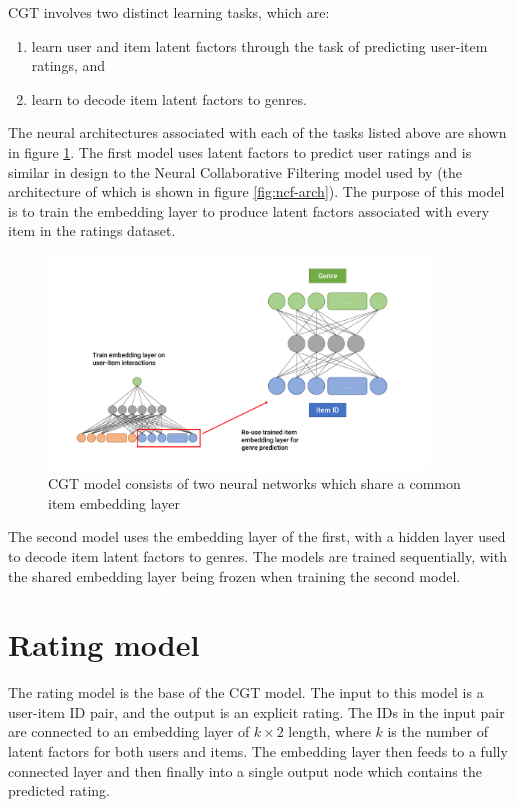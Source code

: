 CGT involves two distinct learning tasks, which are:
\begin{enumerate}
    \item learn user and item latent factors through the task of predicting user-item ratings, and
    \item learn to decode item latent factors to genres.
\end{enumerate}
The neural architectures associated with each of the tasks listed above are shown in figure \ref{fig:4_CGT-architecture}. The first model uses latent factors to predict user ratings and is similar in design to the Neural Collaborative Filtering model used by \citeauthor{he2017neural} (the architecture of which is shown in figure \ref{fig:ncf-arch}). The purpose of this model is to train the embedding layer to produce latent factors associated with every item in the ratings dataset.

\begin{figure}[H]
\centering
\includegraphics[width=0.9\textwidth]{Figures/4_CGT-model.pdf}
\decoRule
\caption[CGT architecture]{CGT model consists of two neural networks which share a common item embedding layer}
\label{fig:4_CGT-architecture}
\end{figure}

The second model uses the embedding layer of the first, with a hidden layer used to decode item latent factors to genres. The models are trained sequentially, with the shared embedding layer being frozen when training the second model.

\section{Rating model}
\label{section:rating-model}
The rating model is the base of the CGT model. The input to this model is a user-item ID pair, and the output is an explicit rating. The IDs in the input pair are connected to an embedding layer of $k\times2$ length, where $k$ is the number of latent factors for both users and items. The embedding layer then feeds to a fully connected layer and then finally into a single output node which contains the predicted rating.

